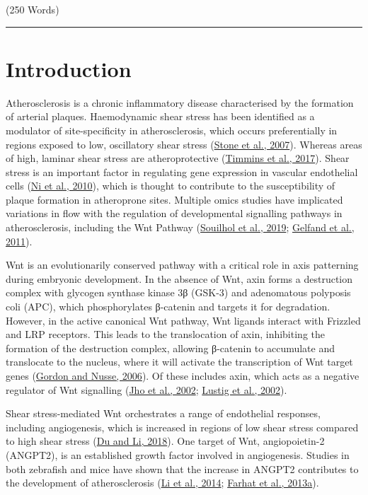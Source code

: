 \documentclass[
  11pt,
]{article}
\begin{document}
\begin{flushright}
(250 Words)\\
\end{flushright}
\rule{\textwidth}{0.4pt}

\hypertarget{introduction}{%
\section{Introduction}\label{introduction}}

Atherosclerosis is a chronic inflammatory disease characterised by the formation of arterial plaques.
Haemodynamic shear stress has been identified as a modulator of site-specificity in atherosclerosis, which occurs preferentially in regions exposed to low, oscillatory shear stress (\protect\hyperlink{ref-stone2007}{Stone et al., 2007}).
Whereas areas of high, laminar shear stress are atheroprotective (\protect\hyperlink{ref-timmins2017}{Timmins et al., 2017}).
Shear stress is an important factor in regulating gene expression in vascular endothelial cells (\protect\hyperlink{ref-Ni2010}{Ni et al., 2010}), which is thought to contribute to the susceptibility of plaque formation in atheroprone sites.
Multiple omics studies have implicated variations in flow with the regulation of developmental signalling pathways in atherosclerosis, including the Wnt Pathway (\protect\hyperlink{ref-Souilhol2020}{Souilhol et al., 2019}; \protect\hyperlink{ref-Gelfand2011}{Gelfand et al., 2011}).

Wnt is an evolutionarily conserved pathway with a critical role in axis patterning during embryonic development.
In the absence of Wnt, axin forms a destruction complex with glycogen synthase kinase 3β (GSK-3) and adenomatous polyposis coli (APC), which phosphorylates β-catenin and targets it for degradation.
However, in the active canonical Wnt pathway, Wnt ligands interact with Frizzled and LRP receptors.
This leads to the translocation of axin, inhibiting the formation of the destruction complex, allowing β-catenin to accumulate and translocate to the nucleus, where it will activate the transcription of Wnt target genes (\protect\hyperlink{ref-gordon2006}{Gordon and Nusse, 2006}).
Of these includes axin, which acts as a negative regulator of Wnt signalling (\protect\hyperlink{ref-Jho2002}{Jho et al., 2002}; \protect\hyperlink{ref-Lustig2002}{Lustig et al., 2002}).

Shear stress-mediated Wnt orchestrates a range of endothelial responses, including angiogenesis, which is increased in regions of low shear stress compared to high shear stress (\protect\hyperlink{ref-du2018}{Du and Li, 2018}).
One target of Wnt, angiopoietin-2 (ANGPT2), is an established growth factor involved in angiogenesis.
Studies in both zebrafish and mice have shown that the increase in ANGPT2 contributes to the development of atherosclerosis (\protect\hyperlink{ref-Li2014-mx}{Li et al., 2014}; \protect\hyperlink{ref-farhat2013}{Farhat et al., 2013a}).
\end{document}
